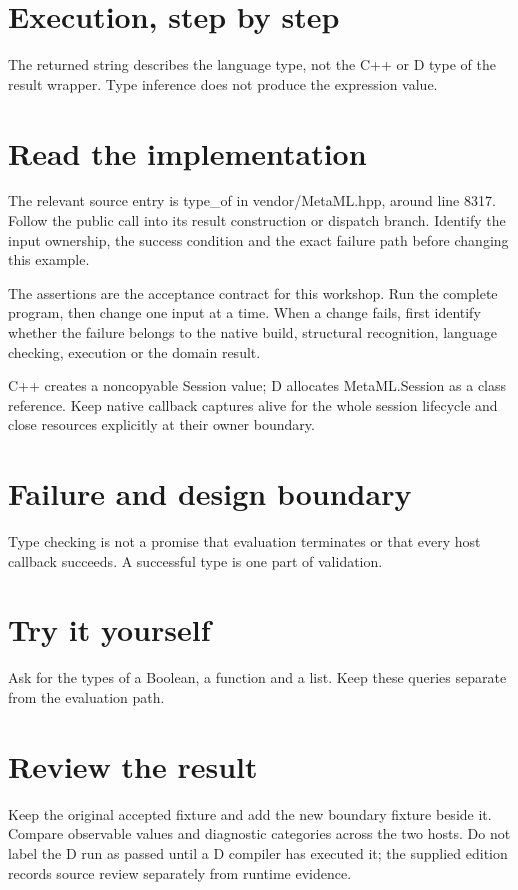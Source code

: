 \section*{Execution, step by step}
The returned string describes the language type, not the C++ or D type of the result wrapper. Type inference does not produce the expression value.

\section*{Read the implementation}
The relevant source entry is type\_of in vendor/MetaML.hpp, around line 8317. Follow the public call into its result construction or dispatch branch. Identify the input ownership, the success condition and the exact failure path before changing this example.

The assertions are the acceptance contract for this workshop. Run the complete program, then change one input at a time. When a change fails, first identify whether the failure belongs to the native build, structural recognition, language checking, execution or the domain result.

\clearpage
{}
C++ creates a noncopyable Session value; D allocates MetaML.Session as a class reference. Keep native callback captures alive for the whole session lifecycle and close resources explicitly at their owner boundary.


\section*{Failure and design boundary}
Type checking is not a promise that evaluation terminates or that every host callback succeeds. A successful type is one part of validation.

\section*{Try it yourself}
Ask for the types of a Boolean, a function and a list. Keep these queries separate from the evaluation path.

\section*{Review the result}
Keep the original accepted fixture and add the new boundary fixture beside it. Compare observable values and diagnostic categories across the two hosts. Do not label the D run as passed until a D compiler has executed it; the supplied edition records source review separately from runtime evidence.


